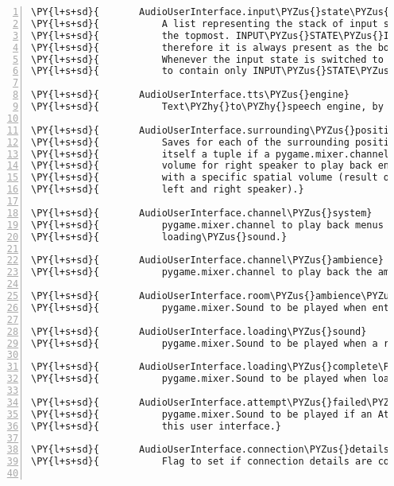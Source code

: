 \begin{Verbatim}[commandchars=\\\{\},numbers=left,firstnumber=1,stepnumber=1]
\PY{l+s+sd}{       AudioUserInterface.input\PYZus{}state\PYZus{}stack}
\PY{l+s+sd}{           A list representing the stack of input states. The current state is}
\PY{l+s+sd}{           the topmost. INPUT\PYZus{}STATE\PYZus{}IN\PYZus{}ROOM is the default in\PYZhy{}game input state,}
\PY{l+s+sd}{           therefore it is always present as the bottommost state on the stack.}
\PY{l+s+sd}{           Whenever the input state is switched to in room, the stack is reset}
\PY{l+s+sd}{           to contain only INPUT\PYZus{}STATE\PYZus{}IN\PYZus{}ROOM.}

\PY{l+s+sd}{       AudioUserInterface.tts\PYZus{}engine}
\PY{l+s+sd}{           Text\PYZhy{}to\PYZhy{}speech engine, by default None.}

\PY{l+s+sd}{       AudioUserInterface.surrounding\PYZus{}position\PYZus{}channels}
\PY{l+s+sd}{           Saves for each of the surrounding positions and the player position}
\PY{l+s+sd}{           itself a tuple if a pygame.mixer.channel, a volume for left and a}
\PY{l+s+sd}{           volume for right speaker to play back entities of surrounding fields}
\PY{l+s+sd}{           with a specific spatial volume (result of different volumes for}
\PY{l+s+sd}{           left and right speaker).}

\PY{l+s+sd}{       AudioUserInterface.channel\PYZus{}system}
\PY{l+s+sd}{           pygame.mixer.channel to play back menus and system events such as}
\PY{l+s+sd}{           loading\PYZus{}sound.}

\PY{l+s+sd}{       AudioUserInterface.channel\PYZus{}ambience}
\PY{l+s+sd}{           pygame.mixer.channel to play back the ambience sounds of a room.}

\PY{l+s+sd}{       AudioUserInterface.room\PYZus{}ambience\PYZus{}sound}
\PY{l+s+sd}{           pygame.mixer.Sound to be played when entering in room input state.}

\PY{l+s+sd}{       AudioUserInterface.loading\PYZus{}sound}
\PY{l+s+sd}{           pygame.mixer.Sound to be played when a room is loading.}

\PY{l+s+sd}{       AudioUserInterface.loading\PYZus{}complete\PYZus{}sound}
\PY{l+s+sd}{           pygame.mixer.Sound to be played when loading a room is complete.}

\PY{l+s+sd}{       AudioUserInterface.attempt\PYZus{}failed\PYZus{}sound}
\PY{l+s+sd}{           pygame.mixer.Sound to be played if an AttemptFailedEvent is sent to}
\PY{l+s+sd}{           this user interface.}

\PY{l+s+sd}{       AudioUserInterface.connection\PYZus{}details\PYZus{}complete}
\PY{l+s+sd}{           Flag to set if connection details are complete.}


\end{Verbatim}
